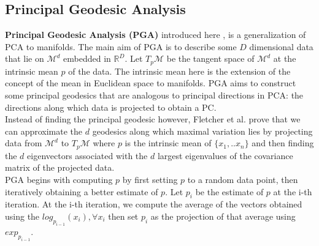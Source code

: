 \documentclass[12pt]{report}
\begin{document}
\subsection{Principal Geodesic Analysis}

\textbf{Principal Geodesic Analysis (PGA)} introduced here \cite{pga}, 
is a generalization of PCA to manifolds. 
The main aim of PGA is to describe some $D$ dimensional data that
lie on $\mathcal{M}^d$ embedded in $\mathbb{R}^D$.
Let $T_p\mathcal{M}$ be the tangent space of $\mathcal{M}^d$ 
at the intrinsic mean $p$ of the data. 
The intrinsic mean here is the extension of the concept 
of the mean in Euclidean space to manifolds.
PGA aims to construct some principal geodesics that are analogous
to principal directions in PCA: the directions along which data is
projected to obtain a PC.\\
Instead of finding the principal geodesic however, Fletcher et al. prove that
we can approximate the $d$ geodesics along which maximal variation lies 
by projecting data from $\mathcal{M}^d$ to $T_p\mathcal{M}$ where 
$p$ is the intrinsic mean of $\{x_1,..x_n\}$
and then finding the 
$d$ eigenvectors associated with the $d$ largest eigenvalues of the 
covariance matrix of the projected data.\\
PGA begins with computing $p$ by first setting 
$p$ to a random data point, 
then iteratively obtaining a better estimate of $p$. Let $p_i$ be the 
estimate of $p$ at the i-th iteration.
At the i-th iteration, we compute the average of the vectors obtained 
using the $log_{p_{i-1}}(x_i), \forall x_i$ then set $p_{i}$ 
as the projection of that average using $exp_{p_{i-1}}$.\\
\end{document}
